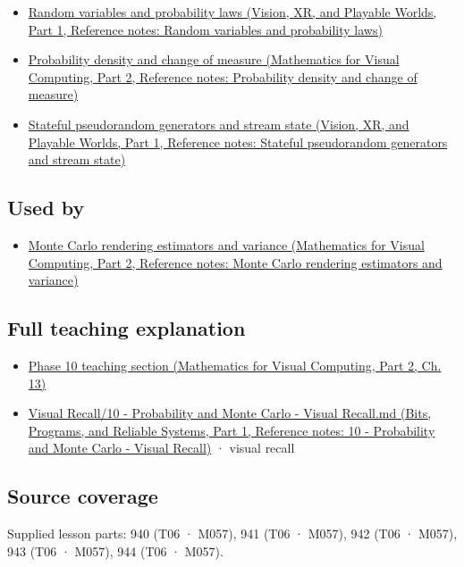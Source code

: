 \begin{itemize}
\tightlist
\item
  \href{../07-Vision-XR-and-Playable-Worlds-P01/main.pdf\#nameddest=appendix-4d0203f7944f}{Random variables and probability laws (Vision, XR, and Playable Worlds, Part 1, Reference notes: Random variables and probability laws)}
\item
  \href{../02-Mathematics-for-Visual-Computing-P02/main.pdf\#nameddest=appendix-4815cd87ab8b}{Probability density and change of measure (Mathematics for Visual Computing, Part 2, Reference notes: Probability density and change of measure)}
\item
  \href{../07-Vision-XR-and-Playable-Worlds-P01/main.pdf\#nameddest=appendix-e0f7c7e08f3a}{Stateful pseudorandom generators and stream state (Vision, XR, and Playable Worlds, Part 1, Reference notes: Stateful pseudorandom generators and stream state)}
\end{itemize}

\subsection{Used by}\label{appendix-8d863ed954d0-used-by}

\hypertarget{appendix-8d863ed954d0-used-by}{}

\begin{itemize}
\tightlist
\item
  \href{../02-Mathematics-for-Visual-Computing-P02/main.pdf\#nameddest=appendix-031e02bf28af}{Monte Carlo rendering estimators and variance (Mathematics for Visual Computing, Part 2, Reference notes: Monte Carlo rendering estimators and variance)}
\end{itemize}

\subsection{Full teaching explanation}\label{appendix-8d863ed954d0-full-teaching-explanation}

\hypertarget{appendix-8d863ed954d0-full-teaching-explanation}{}

\begin{itemize}
\tightlist
\item
  \href{../02-Mathematics-for-Visual-Computing-P02/main.pdf\#nameddest=02-foundations-ii-ch029-transformations-turn-simple-inputs-into-useful-samples}{Phase 10 teaching section (Mathematics for Visual Computing, Part 2, Ch. 13)}
\item
  \href{../01-Bits-Programs-and-Reliable-Systems-P01/main.pdf\#nameddest=appendix-cb5af353ef77}{Visual Recall/10 - Probability and Monte Carlo - Visual Recall.md (Bits, Programs, and Reliable Systems, Part 1, Reference notes: 10 - Probability and Monte Carlo - Visual Recall)} · visual recall
\end{itemize}

\subsection{Source coverage}\label{appendix-8d863ed954d0-source-coverage}

\hypertarget{appendix-8d863ed954d0-source-coverage}{}

Supplied lesson parts: 940 (T06 · M057), 941 (T06 · M057), 942 (T06 · M057), 943 (T06 · M057), 944 (T06 · M057).
